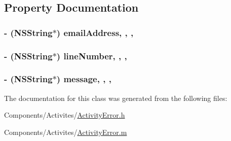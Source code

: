 \subsection{Property Documentation}
\hypertarget{interface_activity_error_ab78c5329eb797a57cfca8b2003703467}{
\subsubsection[{email\-Address}]{\setlength{\rightskip}{0pt plus 5cm}-\/ (N\-S\-String$\ast$) email\-Address\hspace{0.3cm}{\ttfamily [read]}, {\ttfamily [write]}, {\ttfamily [nonatomic]}, {\ttfamily [strong]}}}\label{interface_activity_error_ab78c5329eb797a57cfca8b2003703467}
\hypertarget{interface_activity_error_a1e98d11d46b4e2c1693be54a9573d915}{
\subsubsection[{line\-Number}]{\setlength{\rightskip}{0pt plus 5cm}-\/ (N\-S\-String$\ast$) line\-Number\hspace{0.3cm}{\ttfamily [read]}, {\ttfamily [write]}, {\ttfamily [nonatomic]}, {\ttfamily [strong]}}}\label{interface_activity_error_a1e98d11d46b4e2c1693be54a9573d915}
\hypertarget{interface_activity_error_a77ba32bbb23300ae5b6fdf6f88b75826}{
\subsubsection[{message}]{\setlength{\rightskip}{0pt plus 5cm}-\/ (N\-S\-String$\ast$) message\hspace{0.3cm}{\ttfamily [read]}, {\ttfamily [write]}, {\ttfamily [nonatomic]}, {\ttfamily [strong]}}}\label{interface_activity_error_a77ba32bbb23300ae5b6fdf6f88b75826}


The documentation for this class was generated from the following files\-:\begin{DoxyCompactItemize}
\item 
Components/\-Activites/\hyperlink{_activity_error_8h}{Activity\-Error.\-h}\item 
Components/\-Activites/\hyperlink{_activity_error_8m}{Activity\-Error.\-m}\end{DoxyCompactItemize}

